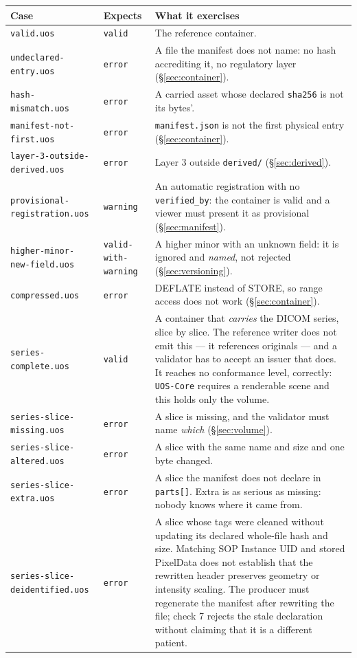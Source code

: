 \documentclass[11pt,a4paper]{article}
\newcommand{\code}[1]{\texttt{\small #1}}
\begin{document}
\begin{longtable}{L{6.3cm} L{2.2cm} L{6.5cm}}
\toprule
\textbf{Case} & \textbf{Expects} & \textbf{What it exercises}\\
\midrule
\endhead
\code{valid.uos} & \code{valid} & The reference container.\\
\code{undeclared-entry.uos} & \code{error} & A file the manifest does not name: no hash
accrediting it, no regulatory layer (\S\ref{sec:container}).\\
\code{hash-mismatch.uos} & \code{error} & A carried asset whose declared \code{sha256} is not
its bytes'.\\
\code{manifest-not-first.uos} & \code{error} & \code{manifest.json} is not the first
physical entry (\S\ref{sec:container}).\\
\code{layer-3-outside-derived.uos} & \code{error} & Layer 3 outside \code{derived/}
(\S\ref{sec:derived}).\\
\code{provisional-registration.uos} & \code{warning} & An automatic registration with no
\code{verified\_by}: the container is valid and a viewer must present it as provisional
(\S\ref{sec:manifest}).\\
\code{higher-minor-new-field.uos} & \code{valid-with-warning} & A higher minor with an unknown
field: it is ignored and \emph{named}, not rejected (\S\ref{sec:versioning}).\\
\code{compressed.uos} & \code{error} & DEFLATE instead of STORE, so range access does not work
(\S\ref{sec:container}).\\
\code{series-complete.uos} & \code{valid} & A container that \emph{carries} the DICOM series, slice
by slice. The reference writer does not emit this --- it references originals --- and a
validator has to accept an issuer that does. It reaches no conformance level, correctly:
\code{UOS-Core} requires a renderable scene and this holds only the volume.\\
\code{series-slice-missing.uos} & \code{error} & A slice is missing, and the validator must name
\emph{which} (\S\ref{sec:volume}).\\
\code{series-slice-altered.uos} & \code{error} & A slice with the same name and size and one byte
changed.\\
\code{series-slice-extra.uos} & \code{error} & A slice the manifest does not declare in
\code{parts[]}. Extra is as serious as missing: nobody knows where it came from.\\
\code{series-slice-deidentified.uos} & \code{error} & A slice whose tags were cleaned
without updating its declared whole-file hash and size. Matching SOP Instance UID and
stored PixelData does not establish that the rewritten header preserves geometry or
intensity scaling. The producer must regenerate the manifest after rewriting the file;
check 7 rejects the stale declaration without claiming that it is a different patient.\\
\bottomrule
\end{longtable}
\end{document}
